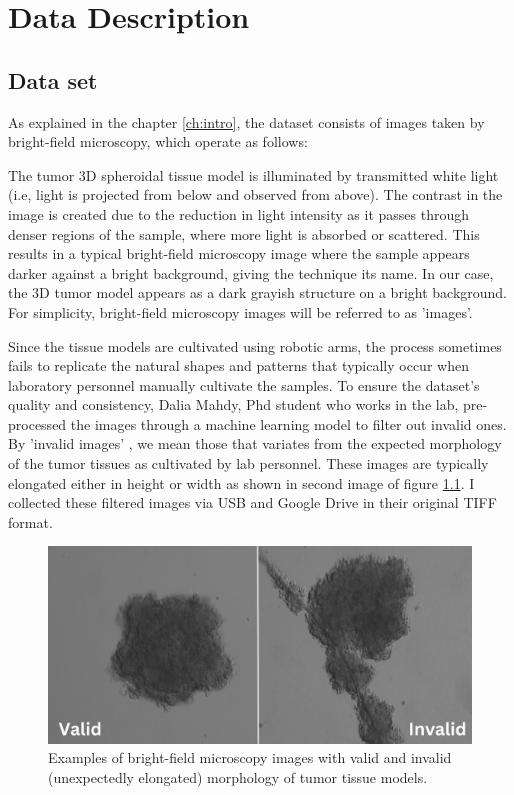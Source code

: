 \chapter{Data Description}\label{ch: DataDescription}
\section{Data set}
\label{sec:Data set}
As explained in the chapter \ref{ch:intro}, the dataset consists of images taken by bright-field microscopy, which operate as follows: 

The tumor 3D spheroidal tissue model is illuminated by transmitted white light (i.e, light is projected from below and observed from above).
 The contrast in the image is created due to the reduction in light intensity as it passes through denser regions of the sample, where more light is
  absorbed or scattered. This results in a typical bright-field microscopy image where the sample appears darker against a bright background, giving 
the technique its name. In our case, the 3D tumor model appears as a dark grayish structure on a bright background. 
For simplicity, bright-field microscopy images will be referred to as 'images'.

 Since the tissue models are cultivated using robotic arms, the process sometimes fails to replicate the natural shapes and patterns that typically occur when laboratory personnel manually cultivate the samples. To ensure the 
 dataset's quality and consistency, Dalia Mahdy, Phd student who works in the lab, pre-processed the images through a machine learning model to filter out invalid ones. By 'invalid images' , we mean
  those that variates from the expected morphology of the tumor tissues as cultivated by lab personnel. These images are typically elongated either in height or width as shown in second image 
 of figure \ref{fig:valid}. I collected these filtered images via USB and Google Drive in their original TIFF format. 

  \begin{figure}[H]
    \centering
    \includegraphics[scale=0.25]{figures/finevalid.png} 
    \caption{Examples of bright-field microscopy images with valid and invalid (unexpectedly elongated) morphology of tumor tissue models.}
    \label{fig:valid}
  \end{figure}

